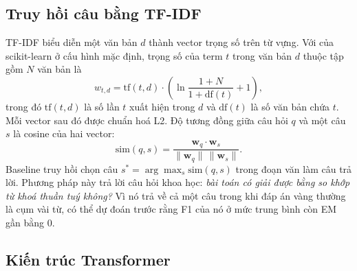 \subsection{Truy hồi câu bằng TF-IDF}
\label{sec:tfidf}

TF-IDF biểu diễn một văn bản $d$ thành vector trọng số trên từ vựng. Với
 của scikit-learn \cite{pedregosa2011sklearn} ở cấu hình mặc định,
trọng số của term $t$ trong văn bản $d$ thuộc tập gồm $N$ văn bản là
\begin{equation}
  w_{t,d} = \mathrm{tf}(t,d) \cdot \left( \ln\frac{1 + N}{1 + \mathrm{df}(t)} + 1 \right),
  \label{eq:tfidf}
\end{equation}
trong đó $\mathrm{tf}(t,d)$ là số lần $t$ xuất hiện trong $d$ và $\mathrm{df}(t)$ là số
văn bản chứa $t$. Mỗi vector sau đó được chuẩn hoá L2. Độ tương đồng giữa câu hỏi $q$
và một câu $s$ là cosine của hai vector:
\begin{equation}
  \mathrm{sim}(q, s) = \frac{\mathbf{w}_q \cdot \mathbf{w}_s}{\lVert \mathbf{w}_q \rVert \, \lVert \mathbf{w}_s \rVert}.
\end{equation}
Baseline truy hồi chọn câu $s^\ast = \arg\max_s \mathrm{sim}(q, s)$ trong đoạn văn làm
câu trả lời. Phương pháp này trả lời câu hỏi khoa học: \emph{bài toán có giải được bằng
so khớp từ khoá thuần tuý không?} Vì nó trả về cả một câu trong khi đáp án vàng thường
là cụm vài từ, có thể dự đoán trước rằng F1 của nó ở mức trung bình còn EM gần bằng 0.

\subsection{Kiến trúc Transformer}

